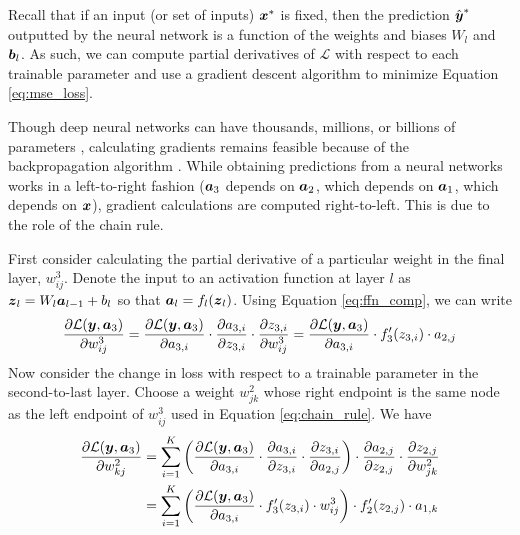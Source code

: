 Recall that if an input (or set of inputs) $\boldsymbol{x}^*$ is fixed, then the prediction $\hat{\boldsymbol{y}}^*$ outputted by the neural network is a function of the weights and biases $W_l$ and $\boldsymbol{b}_l$. As such, we can compute partial derivatives of $\mathcal{L}$ with respect to each trainable parameter and use a gradient descent algorithm to minimize Equation \ref{eq:mse_loss}.

Though deep neural networks can have thousands, millions, or billions of parameters \cite{gpt3}, calculating gradients remains feasible because of the backpropagation algorithm \cite{rojas1996}. While obtaining predictions from a neural networks works in a left-to-right fashion ($\boldsymbol{a}_3$ depends on $\boldsymbol{a}_2$, which depends on $\boldsymbol{a}_1$, which depends on $\boldsymbol{x}$), gradient calculations are computed right-to-left. This is due to the role of the chain rule.

First consider calculating the partial derivative of a particular weight in the final layer, $w_{ij}^3$. Denote the input to an activation function at layer $l$ as $\boldsymbol{z}_l = W_l \boldsymbol{a}_{l-1} + b_l$ so that $\boldsymbol{a}_l = f_l(\boldsymbol{z}_l)$. Using Equation \ref{eq:ffn_comp}, we can write
\begin{equation}
\frac{\partial \mathcal{L}(\boldsymbol{y}, \boldsymbol{a}_3)}{\partial w_{ij}^3} = \frac{\partial \mathcal{L}(\boldsymbol{y}, \boldsymbol{a}_3)}{\partial a_{3,i}} \cdot \frac{\partial a_{3,i}}{\partial z_{3,i}} \cdot \frac{\partial z_{3,i}}{\partial w_{ij}^3} = \frac{\partial \mathcal{L}(\boldsymbol{y}, \boldsymbol{a}_3)}{\partial a_{3,i}} \cdot f_3'(z_{3,i}) \cdot a_{2,j} 
  \label{eq:chain_rule}
\end{equation}
Now consider the change in loss with respect to a trainable parameter in the second-to-last layer. Choose a weight $w_{jk}^2$ whose right endpoint is the same node as the left endpoint of $w_{ij}^3$ used in Equation \ref{eq:chain_rule}. We have
\begin{equation}
  \begin{split}
    \frac{\partial \mathcal{L}(\boldsymbol{y}, \boldsymbol{a}_3)}{\partial w_{kj}^2} &= \sum_{i=1}^K \left(\frac{\partial \mathcal{L}(\boldsymbol{y}, \boldsymbol{a}_3)}{\partial a_{3,i}} \cdot \frac{\partial a_{3,i}}{\partial z_{3,i}} \cdot \frac{\partial z_{3,i}}{\partial a_{2,j}}\right) \cdot \frac{\partial a_{2,j}}{\partial z_{2,j}} \cdot \frac{\partial z_{2,j}}{\partial w_{jk}^2} \\
    &= \sum_{i=1}^K \left(\frac{\partial \mathcal{L}(\boldsymbol{y}, \boldsymbol{a}_3)}{\partial a_{3,i}} \cdot f_3'(z_{3,i}) \cdot w_{ij}^3 \right) \cdot f_2'(z_{2,j}) \cdot a_{1,k}
\end{split}
  \label{eq:chain_rule2}
\end{equation}

